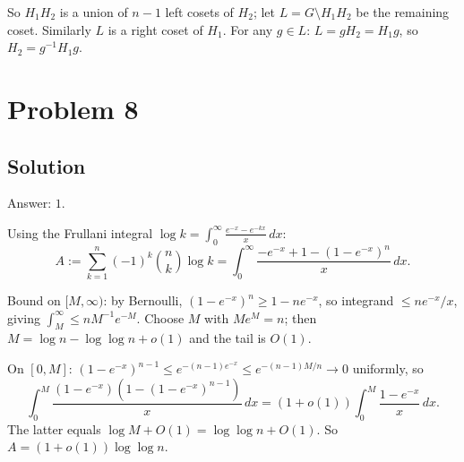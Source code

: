 \documentclass{article}
\begin{document}
So $H_1 H_2$ is a union of $n - 1$ left cosets of $H_2$; let $L = G \setminus H_1 H_2$ be the remaining coset. Similarly $L$ is a right coset of $H_1$. For any $g \in L$: $L = g H_2 = H_1 g$, so $H_2 = g^{-1} H_1 g$.

\section*{Problem 8}
\subsection*{Solution}
Answer: $1$.

Using the Frullani integral $\log k = \int_0^\infty \frac{e^{-x} - e^{-kx}}{x}\, dx$:
\[ A := \sum_{k=1}^n (-1)^k \binom{n}{k} \log k = \int_0^\infty \frac{-e^{-x} + 1 - (1 - e^{-x})^n}{x}\, dx. \]

Bound on $[M, \infty)$: by Bernoulli, $(1 - e^{-x})^n \geq 1 - n e^{-x}$, so integrand $\leq n e^{-x}/x$, giving $\int_M^\infty \leq n M^{-1} e^{-M}$. Choose $M$ with $M e^M = n$; then $M = \log n - \log\log n + o(1)$ and the tail is $O(1)$.

On $[0, M]$: $(1 - e^{-x})^{n-1} \leq e^{-(n-1) e^{-x}} \leq e^{-(n-1) M / n} \to 0$ uniformly, so
\[ \int_0^M \frac{(1 - e^{-x})(1 - (1 - e^{-x})^{n-1})}{x}\, dx = (1 + o(1)) \int_0^M \frac{1 - e^{-x}}{x}\, dx. \]
The latter equals $\log M + O(1) = \log \log n + O(1)$. So $A = (1 + o(1)) \log \log n$.
\end{document}
